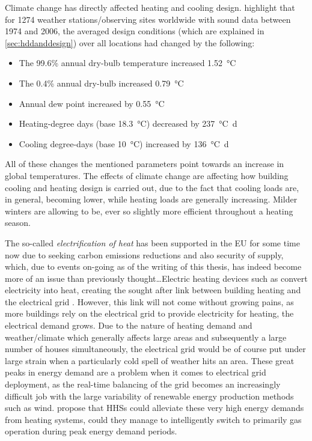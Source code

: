 Climate change has directly affected heating and cooling design.  highlight that for \num{1274} weather stations/observing sites worldwide with sound data between 1974 and 2006, the averaged design conditions (which are explained in \cref{sec:hddanddesign}) over all locations had changed by the following:
\begin{itemize}
    \item The 99.6\% annual dry-bulb temperature increased \SI{1.52}{\celsius}
    \item The 0.4\% annual dry-bulb increased \SI{0.79}{\celsius} 
    \item Annual dew point increased by \SI{0.55}{\celsius} 
    \item Heating-degree days (base \SI{18.3}{\celsius}) decreased by \SI{237}{\celsius\day} 
    \item Cooling degree-days (base \SI{10}{\celsius}) increased by \SI{136}{\celsius\day}
\end{itemize}
All of these changes the mentioned parameters point towards an increase in global temperatures. The effects of climate change are affecting how building cooling and heating design is carried out, due to the fact that cooling loads are, in general, becoming lower, while heating loads are generally increasing. Milder winters are allowing \HPs to be, ever so slightly more efficient throughout a heating season. 


The so-called \textit{electrification of heat} has been supported in the EU for some time now due to seeking carbon emissions reductions and also security of supply, which, due to events on-going as of the writing of this thesis, has indeed become more of an issue than previously thought\dots Electric heating devices such as \HPs convert electricity into heat, creating the sought after link between building heating and the electrical grid \cite{heinen_electricity_2016}. However, this link will not come without growing pains, as more buildings rely on the electrical grid to provide electricity for heating, the electrical demand grows. Due to the nature of heating demand and weather/climate which generally affects large areas and subsequently a large number of houses simultaneously, the electrical grid would be of course put under large strain when a particularly cold spell of weather hits an area. These great peaks in energy demand are a problem when it comes to electrical grid deployment, as the real-time balancing of the grid becomes an increasingly difficult job with the large variability of renewable energy production methods such as wind. \cite{vuillecard_small_2011, thomasen_decarbonisation_2021} propose that \acp{HHS} could alleviate these very high energy demands from heating systems, could they manage to intelligently switch to primarily gas operation during peak energy demand periods. 


